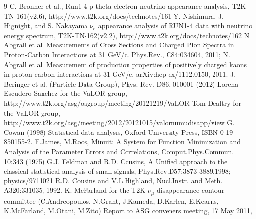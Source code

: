 \begin{thebibliography}{9}
%
% 
%
  C. Bronner et al.,
  Run1-4 p-theta electron neutrino appearance analysis,
  T2K-TN-161(v2.6),
  http://www.t2k.org/docs/technotes/161
  Y. Nishimura, J. Hignight, and S. Nakayama
  $\nu_e$ appearance analysis of RUN1-4 data with neutrino energy spectrum,
  T2K-TN-162(v2.2),
  http://www.t2k.org/docs/technotes/162
%
%
  N Abgrall et al. Measurements of Cross Sections and Charged Pion Spectra in Proton-Carbon Interactions
  at 31 GeV/c. Phys.Rev., C84:034604, 2011;
  N. Abgrall et al. Measurement of production properties of positively charged kaons in proton-carbon
  interactions at 31 GeV/c. arXiv:hep-ex/1112.0150, 2011.
%
%
  J. Beringer et al. (Particle Data Group), Phys. Rev. D86, 010001 (2012)
%
%
  Lorena Escudero Sanchez for the VaLOR group, 
  http://www.t2k.org/asg/oagroup/meeting/20121219/VaLOR%
  Tom Dealtry for the VaLOR group,
  http://www.t2k.org/asg/meeting/2012/20121015/valornumudisapp/view
%
%
  G. Cowan (1998) Statistical data analysis, 
  Oxford University Press, ISBN 0-19-850155-2.
  F.James, M.Roos, Minuit: A System for Function Minimization and Analysis of the 
  Parameter Errors and Correlations, Comput.Phys.Commun. 10:343 (1975)
  G.J. Feldman and R.D. Cousins,
  A Unified approach to the classical statistical analysis of small signals,
  Phys.Rev.D57:3873-3889,1998; physics/9711021
  R.D. Cousins and V.L.Highland, 
  Nucl.Instr. and Meth. A320:331035, 1992.
%
%
  K. McFarland for the T2K $\nu_{\mu}$-disappearance contour committee 
  (C.Andreopoulos, N.Grant, J.Kameda, D.Karlen, E.Kearns, K.McFarland, M.Otani, M.Zito)
  Report to ASG conveners meeting, 17 May 2011,

\end{thebibliography}
